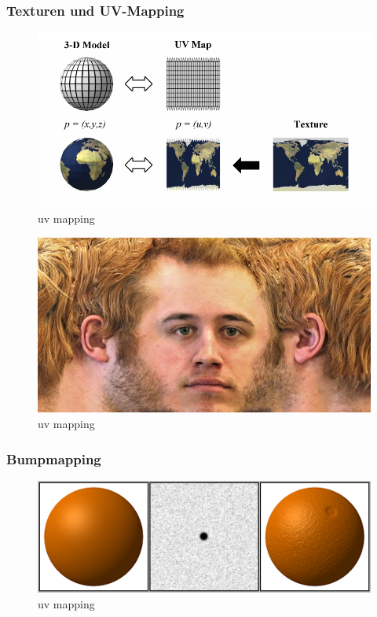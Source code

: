 \subsubsection{Texturen und UV-Mapping}
\begin{figure}[H]
    \centering
    \includegraphics[width=1.0\textwidth]{images/tm_uv.png}
    \caption{uv mapping} %
    \label{fig:uv-mapping1}
\end{figure}

\begin{figure}[H]
    \centering
    \includegraphics[width=1.0\textwidth]{images/tm_face.jpg}
    \caption{uv mapping} %
    \label{fig:uv-mapping2}
\end{figure}


\subsubsection{Bumpmapping}
\begin{figure}[H]
    \centering
    \includegraphics[width=1.0\textwidth]{images/Bumpmap.png}
    \caption{uv mapping} %
    \label{fig:uv-mapping3}
\end{figure}

